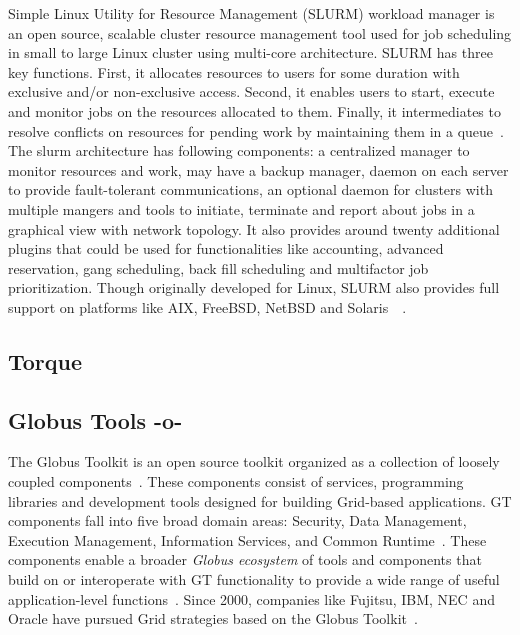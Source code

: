 Simple Linux Utility for Resource Management (SLURM) workload manager
is an open source, scalable cluster resource management tool used for
job scheduling in small to large Linux cluster using multi-core
architecture. SLURM has three key functions. First, it allocates
resources to users for some duration with exclusive and/or
non-exclusive access. Second, it enables users to start, execute and
monitor jobs on the resources allocated to them. Finally, it
intermediates to resolve conflicts on resources for pending work by
maintaining them in a queue~\cite{www-slurmSchedmdSite}. The slurm
architecture has following components: a centralized manager to
monitor resources and work, may have a backup manager, daemon on each
server to provide fault-tolerant communications, an optional daemon
for clusters with multiple mangers and tools to initiate, terminate
and report about jobs in a graphical view with network topology. It
also provides around twenty additional plugins that could be used for
functionalities like accounting, advanced reservation, gang
scheduling, back fill scheduling and multifactor job
prioritization. Though originally developed for Linux, SLURM also
provides full support on platforms like AIX, FreeBSD, NetBSD and
Solaris~\cite{www-slurmPlatformsSite}~\cite{www-slurm}.

     \pv
     
\subsection{Torque}

\pv 

\subsection{Globus Tools -o-}

The Globus Toolkit is an open source toolkit organized as a collection
of loosely coupled components~\cite{sotomayor2006globus}. These
components consist of services, programming libraries and development
tools designed for building Grid-based applications. GT components
fall into five broad domain areas: Security, Data Management,
Execution Management, Information Services, and Common
Runtime~\cite{foster2006globus}. These components enable a broader
\textit{Globus ecosystem} of tools and components that build on or
interoperate with GT functionality to provide a wide range of useful
application-level functions~\cite{www-about-globus}. Since 2000,
companies like Fujitsu, IBM, NEC and Oracle have pursued Grid
strategies based on the Globus Toolkit~\cite{www-about-globus}.

